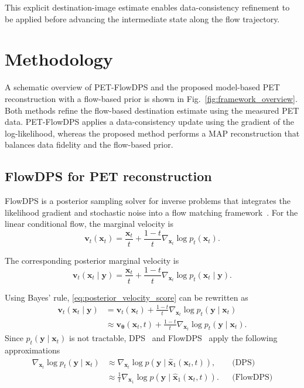 \documentclass[journal]{IEEEtran}
\begin{document}
This explicit destination-image estimate enables data-consistency refinement to be applied before advancing the intermediate state along the flow trajectory.

\section{Methodology}
A schematic overview of PET-FlowDPS and the proposed model-based PET reconstruction with a flow-based prior is shown in Fig.~\ref{fig:framework_overview}. Both methods refine the flow-based destination estimate using the measured PET data. PET-FlowDPS applies a data-consistency update using the gradient of the log-likelihood, whereas the proposed method performs a MAP reconstruction that balances data fidelity and the flow-based prior.

\subsection{FlowDPS for PET reconstruction}
FlowDPS is a posterior sampling solver for inverse problems that integrates the likelihood gradient and stochastic noise into a flow matching framework~\cite{Kim_2025_ICCV}. For the linear conditional flow, the marginal velocity is
\begin{equation}
\bm{v}_t(\bm{x}_t)=\frac{\bm{x}_t}{t}+ \frac{1-t}{t}\nabla_{\bm{x}_t}\log p_t(\bm{x}_t).
\label{eq:flow_velocity_score}
\end{equation}

The corresponding posterior marginal velocity is
\begin{equation}
\bm{v}_t(\bm{x}_t\mid\bm{y}) = \frac{\bm{x}_t}{t} + \frac{1-t}{t} \nabla_{\bm{x}_t} \log p_t(\bm{x}_t\mid\bm{y}).
\label{eq:posterior_velocity_score}
\end{equation}

Using Bayes' rule, \eqref{eq:posterior_velocity_score} can be rewritten as
\begin{equation}
\begin{aligned}
\bm{v}_t(\bm{x}_t\mid\bm{y}) &= \bm{v}_t(\bm{x}_t) + \frac{1-t}{t}\nabla_{\bm{x}_t}\log p_t(\bm{y}\mid\bm{x}_t) \\
&\approx \bm{v}_{\bm{\theta}}(\bm{x}_t,t) + \frac{1-t}{t} \nabla_{\bm{x}_t}\log p_t(\bm{y}\mid\bm{x}_t).
\end{aligned}
\label{eq:flowdps_posterior_velocity}
\end{equation}
Since $p_t(\bm y \mid \bm x_t)$ is not tractable, DPS~\cite{chung2023diffusion} and FlowDPS~\cite{Kim_2025_ICCV} apply the following approximations
\begin{equation}
\begin{aligned}
\nabla_{\bm{x}_t}\log p_t(\bm{y}\mid\bm{x}_t) 
&\approx \nabla_{\bm{x}_t} \log p\left( \bm{y}\mid\hat{\bm{x}}_1(\bm{x}_t,t) \right),
&& \text{(DPS)}
\\ &\approx \frac{1}{t} \nabla_{\hat{\bm{x}}_1} \log p\left( \bm{y}\mid\hat{\bm{x}}_1(\bm{x}_t,t) \right).
&& \text{(FlowDPS)}
\end{aligned}
\label{eq:flowdps_likelihood_approximation}
\end{equation}
\end{document}
